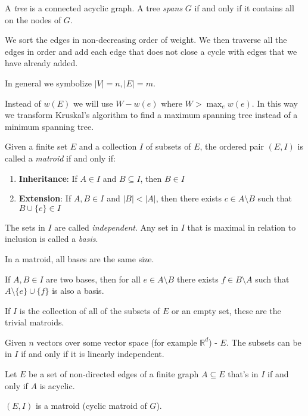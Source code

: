 \documentclass[00_complete]{subfiles}
\begin{document}
A \textit{tree} is a connected acyclic graph. A tree \textit{spans}
$ G $ if and only if it contains all on the nodes of $ G $.

\begin{definition}
    We sort the edges in non-decreasing order of weight. We then traverse all
    the edges in order and add each edge that does not close a cycle with
    edges that we have already added.
\end{definition}

In general we symbolize $ |V|=n, |E|=m $.

Instead of $ w(E) $ we will use $ W- w(e) $ where $ W> \max_e w(e) $. In this
way we transform Kruskal's algorithm to find a maximum spanning tree instead
of a minimum spanning tree.
\begin{definition}[Matroid]
    Given a finite set $ E $ and a collection $ I $ of subsets of $ E $, the
    ordered pair $ (E,I) $ is called a \textit{matroid} if and only if:
    \begin{enumerate}
        \item \textbf{Inheritance}: If $ A \in I $ and $ B \subseteq I $, then
            $ B \in I $
        \item \textbf{Extension}: If $ A,B \in I $ and $ |B|<|A| $, then there
            exists $ c \in A \setminus B $ such that $ B \cup \{e\} \in I $
    \end{enumerate}
\end{definition}
The sets in $ I $ are called \textit{independent}. Any set in $ I $ that is
maximal in relation to inclusion is called a \textit{basis}.
\begin{claim}
    In a matroid, all bases are the same size.
\end{claim}
\begin{claim}[Exchange]
    If $ A,B\in I $ are two bases, then for all $ e \in A \setminus B $ there
    exists $ f \in B \setminus A $ such that $ A \setminus \{e\} \cup \{f\} $ is
    also a basis.
\end{claim}
If $ I $ is the collection of all of the subsets of $ E $ or an empty set, these
are the trivial matroids.

Given $ n $ vectors over some vector space (for example $ \mathbb{R}^d $) -
$ E $. The subsets can be in $ I $ if and only if it is linearly independent.

Let $ E $ be a set of non-directed edges of a finite graph $ A \subseteq E $
that's in $ I $ if and only if $ A $ is acyclic.
\begin{claim}
    $ (E,I) $ is a matroid (cyclic matroid of $ G $).
\end{claim}
\end{document}
